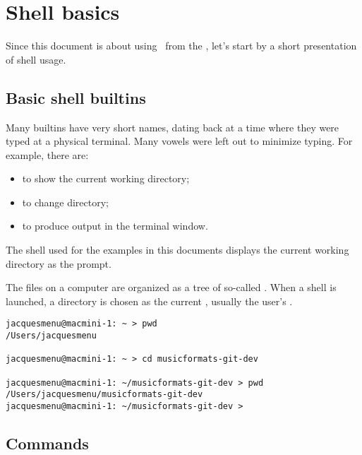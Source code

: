 
\chapter{Shell basics}

Since this document is about using \mf\ from the \CLI, let's start by a short presentation of shell usage.


\section{Basic shell builtins}

Many builtins have very short names, dating back at a time where they were typed at a physical terminal. Many vowels were left out to minimize typing. For example, there are:
\begin{itemize}
\item {} to show the current working directory;
\item {} to change directory;
\item {} to produce output in the terminal window.
\end{itemize}

The shell used for the examples in this documents displays the current working directory as the prompt.

The files on a computer are organized as a tree of so-called . When a shell is launched, a directory is chosen as the current , usually the user's .
\begin{lstlisting}[language=Terminal]
jacquesmenu@macmini-1: ~ > pwd
/Users/jacquesmenu

jacquesmenu@macmini-1: ~ > cd musicformats-git-dev

jacquesmenu@macmini-1: ~/musicformats-git-dev > pwd
/Users/jacquesmenu/musicformats-git-dev
jacquesmenu@macmini-1: ~/musicformats-git-dev >
\end{lstlisting}


\section{Commands}

